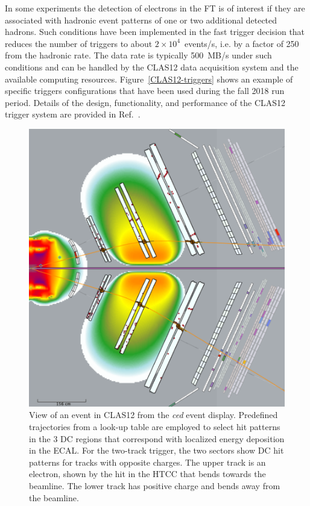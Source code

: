 \documentclass[final,3p,twocolumn]{elsarticle}
\begin{document}
In some experiments the detection of electrons in the FT is of interest if they are associated with hadronic event
patterns of one or two additional detected hadrons. Such conditions have been implemented in the fast trigger decision
that reduces the number of triggers to about $2 \times 10^4$~events/s, i.e. by  a factor of 250 from the hadronic
rate. The data rate is typically 500~MB/s under such conditions and can be handled by the CLAS12 data acquisition
system and the available computing resources. Figure~\ref{CLAS12-triggers} shows an example of specific triggers
configurations that have been used during the fall 2018 run period. Details of the design, functionality, and performance
of the CLAS12 trigger system are provided in Ref.~\cite{TRIG}. 

\begin{figure}[th!]
\centerline{\includegraphics[width=0.95\columnwidth]{trigger.png}}
\caption{View of an event in CLAS12 from the {\it ced} event display. Predefined trajectories from a look-up
  table are employed to select hit patterns in the 3 DC regions that correspond with localized energy deposition
  in the ECAL. For the two-track trigger, the two sectors show DC hit patterns for tracks with opposite charges.
  The upper track is an electron, shown by the hit in the HTCC that bends towards the beamline. The lower track
  has positive charge and bends away from the beamline.}
\label{trigger}
\end{figure}
\end{document}
